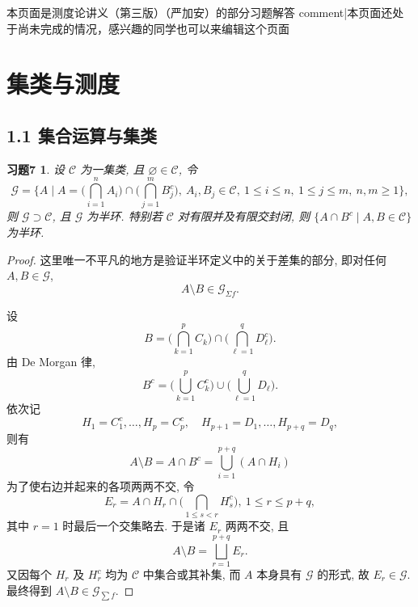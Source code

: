 \theoremstyle{plain}\newtheorem*{1}{习题1}
\theoremstyle{plain}\newtheorem*{2}{习题2}
\theoremstyle{plain}\newtheorem*{3}{习题3}
\theoremstyle{plain}\newtheorem*{4}{习题4}
\theoremstyle{plain}\newtheorem*{5}{习题5}
\theoremstyle{plain}\newtheorem*{6}{习题6}
\theoremstyle{plain}\newtheorem*{7}{习题7}



本页面是测度论讲义（第三版）（严加安）的部分习题解答
{{comment|本页面还处于尚未完成的情况，感兴趣的同学也可以来编辑这个页面}}
\section{集类与测度}
    \subsection{1.1 集合运算与集类}
        \begin{7}
            设 $\mathcal{C}$ 为一集类, 且 $\varnothing\in\mathcal{C}$, 
            令
            \[
                \mathcal{G}=\biggl\{A\mid A=\biggl(\bigcap_{i=1}^n A_i\biggl)\cap\biggl(\bigcap_{j=1}^m B_j^c\biggl),\ A_i,B_j\in\mathcal{C},\ 1\leqslant i\leqslant n,\ 1\leqslant j\leqslant m,\ n,m\geqslant 1\biggl\},
            \]
            则 $\mathcal{G}\supset\mathcal{C}$, 
            且 $\mathcal{G}$ 为半环. 
            特别若 $\mathcal{C}$ 对有限并及有限交封闭, 
            则 $\{A\cap B^c\mid A,B\in\mathcal{C}\}$ 为半环.
        \end{7}
        \begin{proof}
            这里唯一不平凡的地方是验证半环定义中的关于差集的部分, 即对任何 $A,B\in\mathcal{G}$, 
            \[
                A\setminus B\in\mathcal{G}_{\Sigma f}.
            \]
            
            设
            \[
                B=\biggl(\bigcap_{k=1}^p C_k\biggr)\cap\biggl(\bigcap_{\ell=1}^q D_\ell^c\biggr).
            \]
            由 De Morgan 律,
            \[
                B^c=\biggl(\bigcup_{k=1}^p C_k^c\biggl)\cup\biggl(\bigcup_{\ell=1}^q D_\ell\biggl).
            \]
            依次记
            \[
                H_1=C_1^c,\ldots,H_p=C_p^c,\quad
                H_{p+1}=D_1,\ldots,H_{p+q}=D_q,
            \]
            则有
            \[
                A\setminus B
                =A\cap B^c
                =\bigcup_{i=1}^{p+q} (A\cap H_i)
            \]
            为了使右边并起来的各项两两不交, 令
            \[
            E_r=A\cap H_r\cap\biggl(\bigcap_{1\leqslant s<r}H_s^c\biggl),\ 1\leqslant r\leqslant p+q,
            \]
            其中 $r=1$ 时最后一个交集略去. 于是诸 $E_r$ 两两不交, 且
            \[
            A\setminus B
            =\bigsqcup_{r=1}^{p+q}E_r.
            \]
            又因每个 $H_r$ 及 $H_r^c$ 均为 $\mathcal{C}$ 中集合或其补集, 而 $A$ 本身具有 $\mathcal{G}$ 的形式, 故 $E_r\in\mathcal{G}$. 最终得到 $A\setminus B\in\mathcal{G}_{\scriptscriptstyle\sum f}$. 
        \end{proof}
